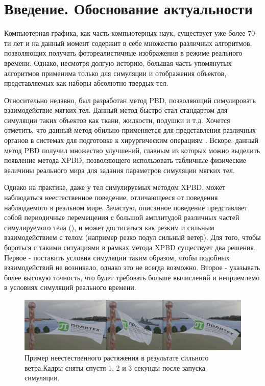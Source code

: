 \chapter*{Введение. Обоснование актуальности} %

Компьютерная графика, как часть компьютерных наук, существует уже более 70-ти лет и на данный момент содержит в себе множество различных алгоритмов, позволяющих получать фотореалистичные изображения в режиме реального времени. Однако, несмотря долгую историю, большая часть упомянутых алгоритмов применима только для симуляции и отображения объектов, представляемых как наборы абсолютно твердых тел. 

Относительно недавно, был разработан метод PBD\cite{pbd}, позволяющий симулировать взаимодействие мягких тел. Данный метод быстро стал стандартом для симуляции таких объектов как ткани, жидкости, подушки и т.д. Хочется отметить, что данный метод обильно применяется для представления различных органов в системах для подготовке к хирургическим операциям \cite{li2022position}. Вскоре, данный метод PBD получил множество улучшений, главным из которых можно выделить появление метода XPBD\cite{xpbd}, позволяющего использовать табличные физические величины реального мира для задания параметров симуляции мягких тел.

Однако на практике, даже у тел симулируемых методом XPBD, может наблюдаться неестественное поведение, отличающееся от поведения наблюдаемого в реальном мире. Зачастую, описанное поведение представляет собой периодичные перемещения с большой амплитудой различных частей симулируемого тела (), и может достигаться как резким и сильным взаимодействием с телом (например резко подул сильный ветер). Для того, чтобы бороться с такими ситуациями в рамках метода XPBD существует два решения. Первое - поставить условия симуляции таким образом, чтобы подобных взаимодействий не возникало, однако это не всегда возможно. Второе - указывать более высокую точность, что будет требовать больше вычислений и неприемлемо в условиях симуляций реального времени. 

\begin{figure}[ht!] 
	\center
	\includegraphics [scale=0.25] {my_folder/images//streching}
	\caption{Пример неестественного растяжения в результате сильного ветра.\newline Кадры сняты спустя 1, 2 и 3 секунды после запуска симуляции.}
	\label{fig:streching}  
\end{figure}

